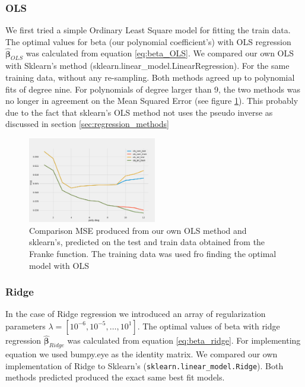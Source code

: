 \subsubsection{OLS}
We first tried a simple Ordinary Least Square model for fitting the train data. 
The optimal values for beta (our polynomial coefficient's) with OLS regression $\hat{\bm{\beta}  }_{OLS}$ was
calculated from equation
\eqref{eq:beta_OLS}. We compared our own OLS with Sklearn's method
(sklearn.linear\_model.LinearRegression). For the same training data, without
any re-sampling. Both methods agreed up to polynomial fits of degree nine.
For polynomials of degree larger than 9, the two methods was no longer in
agreement on the Mean Squared Error (see figure \ref{fig:ols_skl_vs_own}). This
probably due to the fact that sklearn's OLS method not uses the pseudo inverse
as discussed in section \ref{sec:regression_methods} 

\begin{figure}[H]
    \centering
    \includegraphics[width=0.5\textwidth]{Figures/test_mse_sklearn_vs_own.png}
    \caption{Comparison MSE produced from our own OLS method and sklearn's,
    predicted on the test and train data obtained from the Franke function. The
training data was used fro finding the optimal model with OLS}  
    \label{fig:ols_skl_vs_own} 
\end{figure}




\subsubsection{Ridge}
In the case of Ridge regression we introduced an array of regularization
parameters $\lambda = [10^{-6}, 10^{-5}, \hdots, 10^{1}]$. The optimal values
of beta with ridge regression $\hat{\bm{\beta } } _{Ridge} $ was calculated
from equation \eqref{eq:beta_ridge}. For implementing equation we used bumpy.eye as the identity matrix. 
We compared our own implementation of Ridge to Sklearn's
(\verb|sklearn.linear_model.Ridge|). Both methods predicted produced the exact
same best fit models. 



